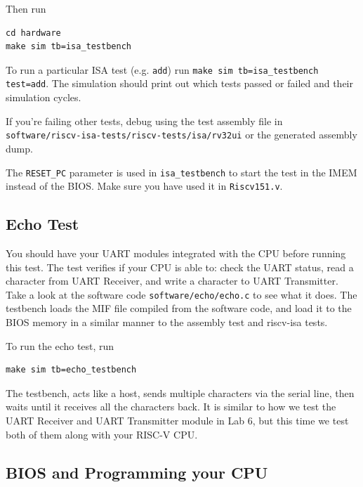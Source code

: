 \documentclass[11pt]{article}
\begin{document}
Then run

\begin{verbatim}
cd hardware
make sim tb=isa_testbench
\end{verbatim}

To run a particular ISA test (e.g. \verb|add|) run \verb|make sim tb=isa_testbench test=add|. The simulation should print out which tests passed or failed and their simulation cycles.


If you're failing other tests, debug using the test assembly file in\\\verb|software/riscv-isa-tests/riscv-tests/isa/rv32ui| or the generated assembly dump.

The \verb|RESET_PC| parameter is used in \verb|isa_testbench| to start the test in the IMEM instead of the BIOS.
Make sure you have used it in \verb|Riscv151.v|.

\subsection{Echo Test}

You should have your UART modules integrated with the CPU before running this test. The test verifies if your CPU is able to: check the UART status, read a character from UART Receiver, and write a character to UART Transmitter. Take a look at the software code \verb|software/echo/echo.c| to see what it does. The testbench loads the MIF file compiled from the software code, and load it to the BIOS memory in a similar manner to the assembly test and riscv-isa tests.

To run the echo test, run

\begin{verbatim}
make sim tb=echo_testbench
\end{verbatim}

The testbench, acts like a host, sends multiple characters via the serial line, then waits until it receives all the characters back. It is similar to how we test the UART Receiver and UART Transmitter module in Lab 6, but this time we test both of them along with your RISC-V CPU.

\subsection{BIOS and Programming your CPU}
\label{bios_info}
\end{document}

